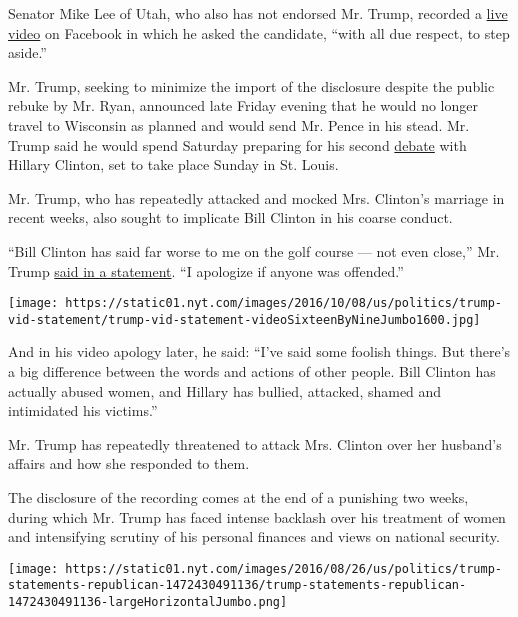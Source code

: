 Senator Mike Lee of Utah, who also has not endorsed Mr. Trump, recorded
a
\href{https://www.facebook.com/mikeleeUT/videos/10154626306667431/?hc_ref=NEWSFEED}{live
video} on Facebook in which he asked the candidate, ``with all due
respect, to step aside.''

Mr. Trump, seeking to minimize the import of the disclosure despite the
public rebuke by Mr. Ryan, announced late Friday evening that he would
no longer travel to Wisconsin as planned and would send Mr. Pence in his
stead. Mr. Trump said he would spend Saturday preparing for his second
\href{http://www.nytimes.com/2016/10/09/us/politics/presidential-debate.html}{debate}
with Hillary Clinton, set to take place Sunday in St. Louis.

Mr. Trump, who has repeatedly attacked and mocked Mrs. Clinton's
marriage in recent weeks, also sought to implicate Bill Clinton in his
coarse conduct.

``Bill Clinton has said far worse to me on the golf course --- not even
close,'' Mr. Trump
\href{https://www.donaldjtrump.com/press-releases/statement-from-donald-j.-trump}{said
in a statement}. ``I apologize if anyone was offended.''

\texttt{[image: https://static01.nyt.com/images/2016/10/08/us/politics/trump-vid-statement/trump-vid-statement-videoSixteenByNineJumbo1600.jpg]}

And in his video apology later, he said: ``I've said some foolish
things. But there's a big difference between the words and actions of
other people. Bill Clinton has actually abused women, and Hillary has
bullied, attacked, shamed and intimidated his victims.''

Mr. Trump has repeatedly threatened to attack Mrs. Clinton over her
husband's affairs and how she responded to them.

The disclosure of the recording comes at the end of a punishing two
weeks, during which Mr. Trump has faced intense backlash over his
treatment of women and intensifying scrutiny of his personal finances
and views on national security.

\href{https://www.nytimes.com/interactive/2016/08/29/us/politics/at-least-110-republican-leaders-wont-vote-for-donald-trump-heres-when-they-reached-their-breaking-point.html}{}

\texttt{[image: https://static01.nyt.com/images/2016/08/26/us/politics/trump-statements-republican-1472430491136/trump-statements-republican-1472430491136-largeHorizontalJumbo.png]}

